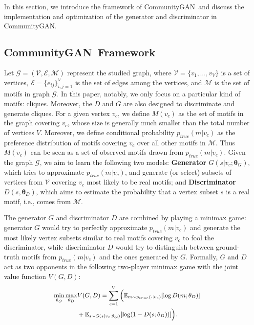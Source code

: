 \documentclass[sigconf]{acmart}
\newcommand{\ComGAN}{CommunityGAN}
\begin{document}
In this section, we introduce the framework of \ComGAN~and discuss the implementation and optimization of the generator and discriminator in \ComGAN.

\subsection{\ComGAN~Framework}

Let $\mathcal{G} = (\mathcal{V}, \mathcal{E}, \mathcal{M})$ represent the studied graph, where $\mathcal{V}=\{v_1,\ldots ,v_V\}$ is a set of vertices, $\mathcal{E}=\{e_{ij}\}_{i,j=1}^V$ is the set of edges among the vertices, and $\mathcal{M}$ is the set of motifs in graph $\mathcal{G}$.
In this paper, notably, we only focus on a particular kind of motifs: cliques.
Moreover, the $D$ and $G$ are also designed to discriminate and generate cliques.
For a given vertex $v_c$, we define $M(v_c)$ as the set of motifs in the graph covering $v_c$, whose size is generally much smaller than the total number of vertices $V$.
Moreover, we define conditional probability $p_{true}(m|v_c)$ as the preference distribution of motifs covering $v_c$ over all other motifs in $\mathcal{M}$.
Thus $M(v_c)$ can be seen as a set of observed motifs drawn from $p_{true}(m|v_c)$.
Given the graph $\mathcal{G}$, we aim to learn the following two models:
\textbf{Generator} $G(s|v_c;\mathbf{\theta}_G)$, which tries to approximate $p_{true}(m|v_c)$, and generate (or select) subsets of vertices from $\mathcal{V}$ covering $v_c$ most likely to be real motifs; and
\textbf{Discriminator} $D(s, \mathbf{\theta}_D)$, which aims to estimate the probability that a vertex subset $s$ is a real motif, i.e., comes from $\mathcal{M}$.

The generator $G$ and discriminator $D$ are combined by playing a minimax game:
generator $G$ would try to perfectly approximate $p_{true}(m|v_c)$ and generate the most likely vertex subsets similar to real motifs covering $v_c$ to fool the discriminator,
while discriminator $D$ would try to distinguish between ground-truth motifs from $p_{true}(m|v_c)$ and the ones generated by $G$.
Formally, $G$ and $D$ act as two opponents in the following two-player minimax game with the joint value function $V(G, D)$:
\begin{equation}
\label{eq:loss-func}
\small
\begin{aligned}
  \min_{\mathbf{\theta}_G}\max_{\mathbf{\theta}_D}&V(G, D)=\sum_{c=1}^V \Big(\mathbb{E}_{m \sim p_{true}(\cdot|v_c)}[\log D(m;\mathbf{\theta}_D)]\\
  &+\mathbb{E}_{s \sim G(s|v_c;\mathbf{\theta}_G)}[\log (1 - D(s;\mathbf{\theta}_D))] \Big).
\end{aligned}
\end{equation}
\end{document}

